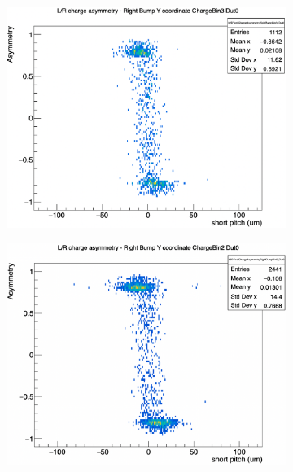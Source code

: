 \begin{figure}[H]
    \centering
    \begin{subfigure}[t]{0.45\textwidth}
        \centering
        \includegraphics[width=\textwidth]{images/YAsymBin3.png}
        \caption{}
        \label{fig:dist_a}
    \end{subfigure}
    \hfill
    \begin{subfigure}[t]{0.45\textwidth}
        \centering
        \includegraphics[width=\textwidth]{images/YAsymBin2.png}
        \caption{}
        \label{fig:dist_b}
    \end{subfigure}


\end{figure}
